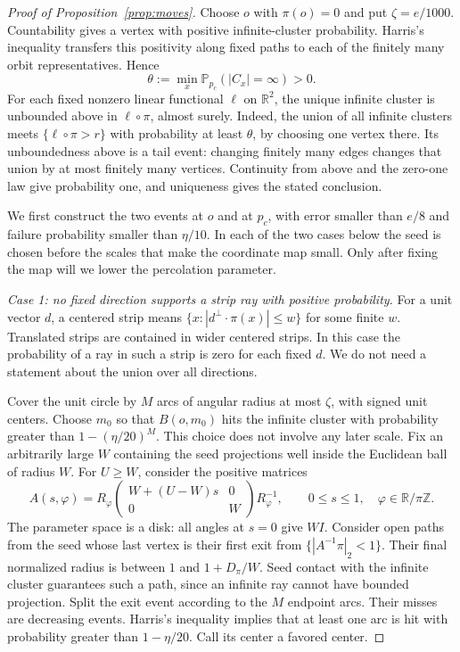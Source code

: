 \documentclass[11pt]{article}
\theoremstyle{definition}
\newcommand{\PP}{\mathbb P}
\newcommand{\pc}{p_c}
\begin{document}
\begin{proof}[Proof of Proposition~\ref{prop:moves}]
Choose $o$ with $\pi(o)=0$ and put $\zeta=e/1000$.
Countability gives a vertex with positive infinite-cluster probability.
Harris's inequality transfers this positivity along fixed paths to each
of the finitely many orbit representatives. Hence
\[
 \theta:=\min_x\PP_{\pc}(|C_x|=\infty)>0.
\]
For each fixed nonzero linear functional \(\ell\) on \(\mathbb R^2\),
the unique infinite cluster is unbounded above in \(\ell\circ\pi\),
almost surely. Indeed, the union of all infinite clusters meets
\(\{\ell\circ\pi>r\}\) with probability at least \(\theta\), by
choosing one vertex there. Its unboundedness above is a tail event:
changing finitely many edges changes that union by at most finitely
many vertices. Continuity from above and the zero-one law give
probability one, and uniqueness gives the stated conclusion.

We first construct the two events at \(o\) and at \(\pc\), with error
smaller than \(e/8\) and failure probability smaller than \(\eta/10\).
In each of the two cases below the seed is chosen before the scales
that make the coordinate map small. Only after fixing the map will we
lower the percolation parameter.

\emph{Case 1: no fixed direction supports a strip ray with positive
probability.} For a unit vector $d$, a centered strip means
$\{x:|d^\perp\cdot\pi(x)|\le w\}$ for some finite $w$. Translated
strips are contained in wider centered strips. In this case the
probability of a ray in such a strip is zero for each fixed $d$.
We do not need a statement about the union over all directions.

Cover the unit circle by $M$ arcs of angular radius at most $\zeta$,
with signed unit centers. Choose $m_0$ so that $B(o,m_0)$ hits the
infinite cluster with probability greater than $1-(\eta/20)^M$.
This choice does not involve any later scale. Fix an arbitrarily large
$W$ containing the seed projections well inside the Euclidean ball of
radius $W$. For $U\ge W$, consider the positive matrices
\[
 A(s,\varphi)=R_\varphi
       \begin{pmatrix}W+(U-W)s&0\\0&W\end{pmatrix}R_\varphi^{-1},
 \qquad 0\le s\le1,\quad\varphi\in\mathbb R/\pi\mathbb Z.
\]
The parameter space is a disk: all angles at $s=0$ give $W I$.
Consider open paths from the seed whose last vertex is their first
exit from $\{|A^{-1}\pi|_2<1\}$. Their final normalized radius is
between $1$ and $1+D_\pi/W$. Seed contact with the infinite cluster
guarantees such a path, since an infinite ray cannot have bounded
projection. Split the exit event according to the $M$ endpoint arcs.
Their misses are decreasing events. Harris's inequality implies that
at least one arc is hit with probability greater than $1-\eta/20$.
Call its center a favored center.


\end{proof}
\end{document}
